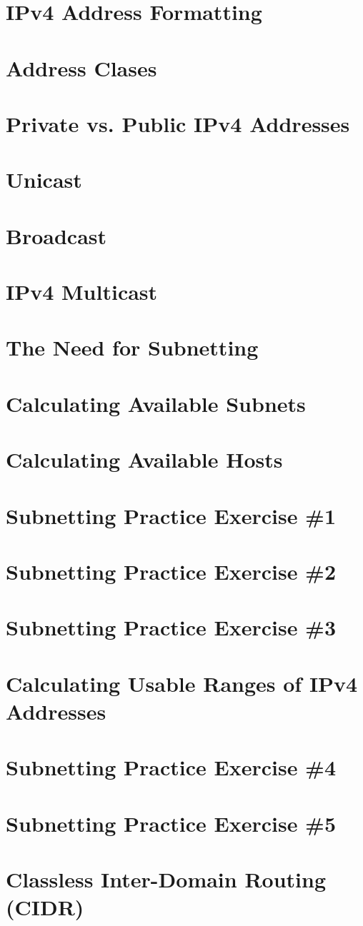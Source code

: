 \section{IPv4 Address Formatting}
\section{Address Clases}
\section{Private vs. Public IPv4 Addresses}
\section{Unicast}
\section{Broadcast}
\section{IPv4 Multicast}
\section{The Need for Subnetting}
\section{Calculating Available Subnets}
\section{Calculating Available Hosts}
\section{Subnetting Practice Exercise \#1}
\section{Subnetting Practice Exercise \#2}
\section{Subnetting Practice Exercise \#3}
\section{Calculating Usable Ranges of IPv4 Addresses}
\section{Subnetting Practice Exercise \#4}
\section{Subnetting Practice Exercise \#5}
\section{Classless Inter-Domain Routing (CIDR)}
